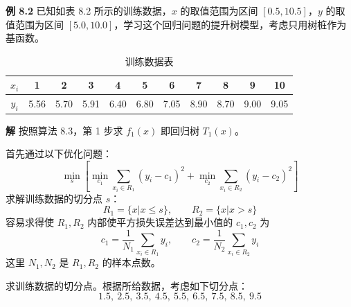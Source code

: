 \documentclass[UTF8,12pt,a4paper,fontset=fandol]{ctexart}
\begin{document}
\begin{center}
\end{center}

\noindent\textbf{例 8.2}\quad
已知如表 8.2 所示的训练数据，$x$ 的取值范围为区间 $[0.5,10.5]$，$y$ 的取值范围为区间 $[5.0,10.0]$，学习这个回归问题的提升树模型，考虑只用树桩作为基函数。

\begin{table}[htbp]
\centering
\caption{训练数据表}
\begin{tabular}{c*{10}{c}}
\toprule
$x_i$ & 1 & 2 & 3 & 4 & 5 & 6 & 7 & 8 & 9 & 10\\
\midrule
$y_i$ & 5.56 & 5.70 & 5.91 & 6.40 & 6.80 & 7.05 & 8.90 & 8.70 & 9.00 & 9.05\\
\bottomrule
\end{tabular}
\end{table}

\noindent\textbf{解}\quad
按照算法 8.3，第 1 步求 $f_1(x)$ 即回归树 $T_1(x)$。

首先通过以下优化问题：
\[
\min_s\left[
\min_{c_1}\sum_{x_i\in R_1}(y_i-c_1)^2
+\min_{c_2}\sum_{x_i\in R_2}(y_i-c_2)^2
\right]
\]
求解训练数据的切分点 $s$：
\[
R_1=\{x|x\leq s\},\qquad R_2=\{x|x>s\}
\]
容易求得使 $R_1,R_2$ 内部使平方损失误差达到最小值的 $c_1,c_2$ 为
\[
c_1=\frac{1}{N_1}\sum_{x_i\in R_1}y_i,\qquad
c_2=\frac{1}{N_2}\sum_{x_i\in R_2}y_i
\]
这里 $N_1,N_2$ 是 $R_1,R_2$ 的样本点数。

求训练数据的切分点。根据所给数据，考虑如下切分点：
\[
1.5,\ 2.5,\ 3.5,\ 4.5,\ 5.5,\ 6.5,\ 7.5,\ 8.5,\ 9.5
\]
\end{document}
